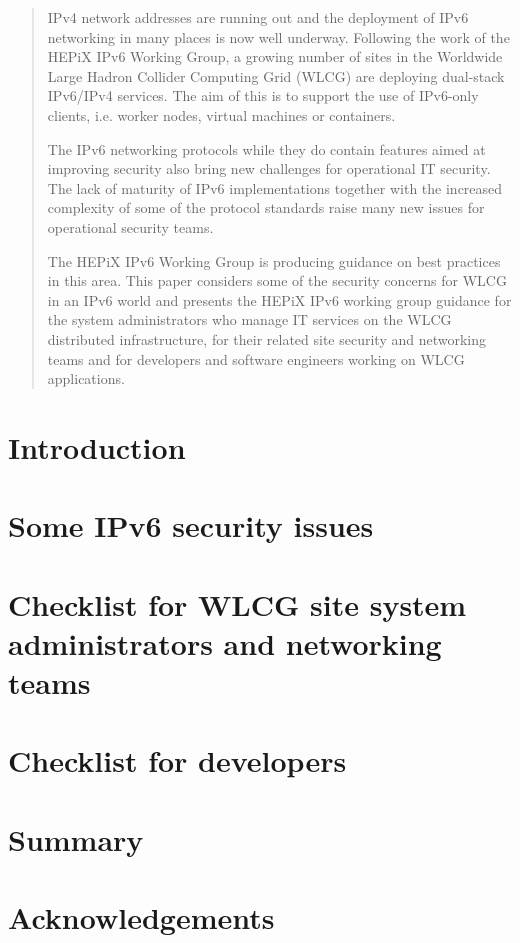 \documentclass[a4paper]{jpconf}
\begin{document}
\begin{abstract}
IPv4 network addresses are running out and the deployment of IPv6 networking in many places is now well underway. Following the work of the HEPiX IPv6 Working Group, a growing number of sites in the Worldwide Large Hadron Collider Computing Grid (WLCG) are deploying dual-stack IPv6/IPv4 services. The aim of this is to support the use of IPv6-only clients, i.e. worker nodes, virtual machines or containers.
\par
The IPv6 networking protocols while they do contain features aimed at improving security also bring new challenges for operational IT security. 
The lack of maturity of IPv6 implementations together with the increased complexity of some of the protocol standards 
raise many new issues for operational security teams.
\par
The HEPiX IPv6 Working Group is producing guidance on best practices in this area. This paper considers some of the security concerns for WLCG in an IPv6 world and presents the HEPiX IPv6 working group guidance for the system administrators who manage IT services  on the WLCG distributed infrastructure, for their related site security and networking teams and for developers and software engineers working on WLCG applications.
\end{abstract}

\section{Introduction}


\section{Some IPv6 security issues}


\section{Checklist for WLCG site system administrators and networking teams}


\section{Checklist for developers}


\section{Summary}


\section*{Acknowledgements}



\pagebreak

\end{document}
